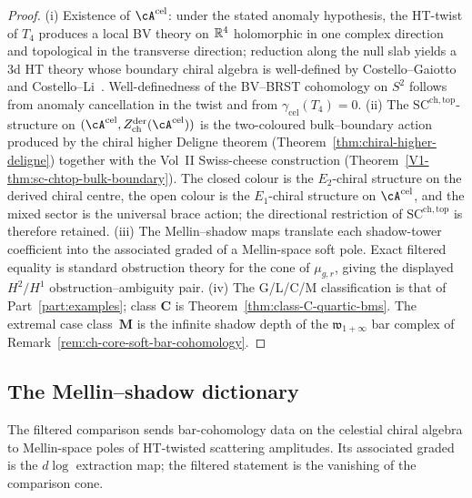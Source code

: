 \begin{proof}
(i) Existence of $\cA^{\mathrm{cel}}$: under the stated anomaly
hypothesis, the HT-twist of $T_4$ produces a local BV theory on $\mathbb R^4$
holomorphic in one
complex direction and topological in the transverse direction; reduction
along the null slab yields a $3$d HT theory whose boundary chiral
algebra is well-defined by Costello--Gaiotto~\cite{CostelloGaiottoBoundaryVOA}
and Costello--Li~\cite{CostelloLiTwistedSugra}. Well-definedness of the
BV--BRST cohomology on $S^2$ follows from anomaly cancellation in the
twist and from $\gamma_{\mathrm{cel}}(T_4)=0$.
(ii) The $\mathrm{SC}^{\mathrm{ch,top}}$-structure on
$(\cA^{\mathrm{cel}}, Z^{\mathrm{der}}_{\mathrm{ch}}(\cA^{\mathrm{cel}}))$
is the two-coloured bulk--boundary action produced by the chiral
higher Deligne theorem (Theorem~\ref{thm:chiral-higher-deligne})
together with the Vol~II Swiss-cheese construction
(Theorem~\ref{V1-thm:sc-chtop-bulk-boundary}). The closed colour is
the $E_2$-chiral structure on the derived chiral centre, the open
colour is the $E_1$-chiral structure on $\cA^{\mathrm{cel}}$, and the
mixed sector is the universal brace action; the directional
restriction of $\mathrm{SC}^{\mathrm{ch,top}}$ is therefore retained.
(iii) The Mellin--shadow maps translate each shadow-tower coefficient
into the associated graded of a Mellin-space soft pole. Exact filtered equality is standard
obstruction theory for the cone of $\mu_{g,r}$, giving the displayed
$H^2/H^1$ obstruction--ambiguity pair.
(iv) The G/L/C/M classification is that of Part~\ref{part:examples};
class $\mathbf C$ is Theorem~\ref{thm:class-C-quartic-bms}. The
extremal case class~$\mathbf M$ is the infinite shadow depth of the
$\mathfrak{w}_{1+\infty}$ bar complex of Remark~\ref{rem:ch-core-soft-bar-cohomology}.
\end{proof}

\subsection{The Mellin--shadow dictionary}
\label{subsec:mellin-shadow-dictionary}

The filtered comparison sends bar-cohomology data on the celestial chiral algebra to Mellin-space poles of HT-twisted scattering amplitudes. Its associated graded is the $d\log$ extraction map; the filtered statement is the vanishing of the comparison cone.

